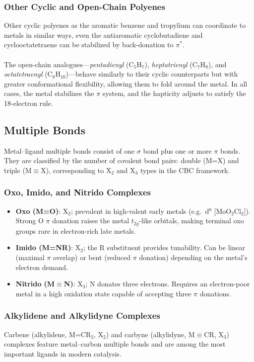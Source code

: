 \subsubsection{Other Cyclic and Open-Chain Polyenes}
%
Other cyclic polyenes as the aromatic benzene and tropylium can coordinate to metals in similar ways, 
even the antiaromatic cyclobutadiene and cyclooctatetraene can be stabilized by back-donation to $\pi^*$.\\ \\
%
The open-chain analogues---\emph{pentadienyl} (C$_5$H$_7$), \emph{heptatrienyl} (C$_7$H$_9$),
and \emph{octatetraenyl} (C$_8$H$_{10}$)---behave similarly to their cyclic counterparts
but with greater conformational flexibility, allowing them to fold around the metal.
In all cases, the metal stabilizes the $\pi$ system, and the hapticity adjusts to satisfy the 18-electron rule.
%
\subsection{Multiple Bonds}
%
Metal--ligand multiple bonds consist of one $\sigma$ bond plus one or more $\pi$ bonds.
They are classified by the number of covalent bond pairs: double (M=X) and triple (M$\equiv$X),
corresponding to X$_2$ and X$_3$ types in the CBC framework.
%
\subsubsection{Oxo, Imido, and Nitrido Complexes}
%
\begin{itemize}
	\item \textbf{Oxo (M=O)}: X$_2$; prevalent in high-valent early metals (e.g.\ d$^0$ [MoO$_2$Cl$_2$]).
		Strong O $\pi$ donation raises the metal $t_{2g}$-like orbitals,
		making terminal oxo groups rare in electron-rich late metals.
	\item \textbf{Imido (M=NR)}: X$_2$; the R substituent provides tunability.
		Can be linear (maximal $\pi$ overlap) or bent (reduced $\pi$ donation)
		depending on the metal's electron demand.
	\item \textbf{Nitrido (M$\equiv$N)}: X$_3$; N donates three electrons.
		Requires an electron-poor metal in a high oxidation state capable of accepting three $\pi$ donations.
\end{itemize}
%
\subsubsection{Alkylidene and Alkylidyne Complexes}
%
Carbene (alkylidene, M=CR$_2$, X$_2$) and carbyne (alkylidyne, M$\equiv$CR, X$_3$) complexes
feature metal--carbon multiple bonds and are among the most important ligands in modern catalysis.
%
